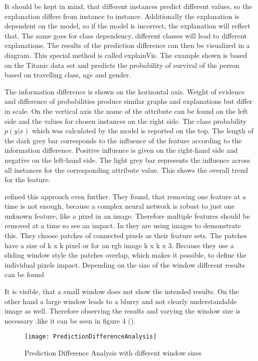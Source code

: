 It should be kept in mind, that different instances predict different values, so the explanation differs from instance to instance. Additionally the explanation is dependent on the model, so if the model is incorrect, the explanation will reflect that. The same goes for class dependency, different classes will lead to different explanations.
The results of the prediction difference can then be visualized in a diagram. This special method is called explainVis. The example shown is based on the Titanic data set and predicts the probability of survival of the person based on travelling class, age and gender.
\par
The information difference is shown on the horizontal axis. Weight of evidence and difference of probabilities produce similar graphs and explanations but differ in scale. On the vertical axis the name of the attribute can be found on the left side and the values for chosen instances on the right side. The class probability 
$p(y|x)$
 which was calculated by the model is reported on the top.
The length of the dark grey bar corresponds to the influence of the feature according to the information difference. Positive influence is given on the right-hand side and negative on the left-hand side. The light grey bar represents the influence across all instances for the corresponding attribute value. This shows the overall trend for the feature.
\par
{} refined this approach even further. They found, that removing one feature at a time is not enough, because a complex neural network is robust to just one unknown feature, like a pixel in an image. Therefore multiple features should be removed at a time so see an impact. In \cite{Zintgraf.2017} they are using images to demonstrate this. They choose patches of connected pixels as their feature sets. The patches have a size of k x k pixel or for an rgb image k x k x 3. Because they use a sliding window style the patches overlap, which makes it possible, to define the individual pixels impact. Depending on the size of the window different results can be found 
\par
It is visible, that a small window does not show the intended results. On the other hand a large window leads to a blurry and not clearly understandable image as well. Therefore observing the results and varying the window size is necessary .like it can be seen in figure 4 (\cite{Zintgraf.2017}). 
\begin{figure*}
    \center
    \texttt{[image: PredictionDifferenceAnalysis]}
    \caption{Prediction Difference Analysis with different window sizes}
\end{figure*}

